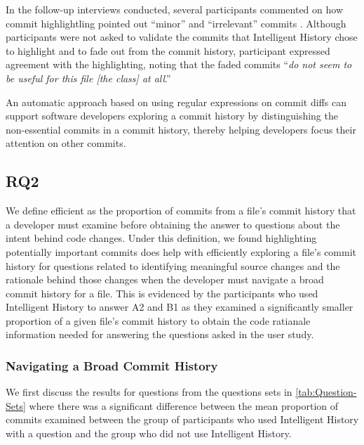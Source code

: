 In the follow-up interviews conducted, 
several participants commented on how commit highlightling pointed out ``minor'' and ``irrelevant'' commits .
Although participants were not asked to validate the commits that Intelligent History chose to highlight and to fade out from the commit history, 
participant  expressed agreement with the highlighting, noting that the faded commits ``\textit{do not seem to be useful for this file [the  class] at all}.''

\begin{summary}[RQ1]
  An automatic approach based on using regular expressions on commit diffs can support software developers exploring a commit history 
  by distinguishing the non-essential commits in a commit history,
  thereby helping developers focus their attention on other commits.
\end{summary}


\subsection{RQ2}
\label{subsec:RQ2}


We define efficient as the proportion of commits from a file's commit history that a developer must examine before obtaining the answer to questions about the intent behind code changes.
Under this definition, we found highlighting potentially important commits does help with efficiently exploring a file's commit history for questions related to identifying meaningful source changes and the rationale behind those changes when the developer must navigate a broad commit history for a file. 
This is evidenced by the participants who used Intelligent History to answer A2 and B1 as they examined a significantly smaller proportion of a given file's commit history to obtain the code ratianale information needed for answering the questions asked in the user study.

\subsubsection{Navigating a Broad Commit History}

We first discuss the results for questions from the questions sets in \autoref{tab:Question-Sets} where there was a significant difference between
the mean proportion of commits examined between the group of participants who used Intelligent History with a question and the group who did not use Intelligent History.

